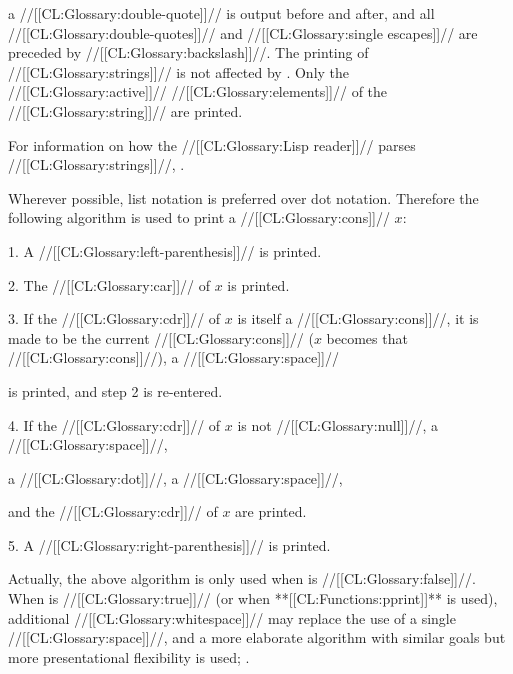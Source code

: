a //[[CL:Glossary:double-quote]]// is output before and after, and all //[[CL:Glossary:double-quotes]]// and //[[CL:Glossary:single escapes]]// are preceded by //[[CL:Glossary:backslash]]//. The printing of //[[CL:Glossary:strings]]// is not affected by . Only the //[[CL:Glossary:active]]// //[[CL:Glossary:elements]]// of the //[[CL:Glossary:string]]// are printed.

For information on how the //[[CL:Glossary:Lisp reader]]// parses //[[CL:Glossary:strings]]//, \seesection\Doublequote.

\endsubsubsection%

Wherever possible, list notation is preferred over dot notation.   Therefore the following algorithm is used to print a //[[CL:Glossary:cons]]// $x$:

\goodbreak \beginlist \item{1.} A //[[CL:Glossary:left-parenthesis]]// is printed.

\medbreak \item{2.} The //[[CL:Glossary:car]]// of $x$ is printed. 

\medbreak \item{3.} If the //[[CL:Glossary:cdr]]// of $x$ is itself a //[[CL:Glossary:cons]]//,
          it is made to be the current //[[CL:Glossary:cons]]//  	  (\ie $x$ becomes that //[[CL:Glossary:cons]]//),   	  a //[[CL:Glossary:space]]//

	  is printed,
          and step 2 is re-entered.

\medbreak \item{4.} If the //[[CL:Glossary:cdr]]// of $x$ is not //[[CL:Glossary:null]]//,   	  a //[[CL:Glossary:space]]//,

          a //[[CL:Glossary:dot]]//,  	  a //[[CL:Glossary:space]]//,

          and the //[[CL:Glossary:cdr]]// of $x$ are printed.

\medbreak \item{5.} A //[[CL:Glossary:right-parenthesis]]// is printed. \endlist

 Actually, the above algorithm is only used when  is //[[CL:Glossary:false]]//.  When  is //[[CL:Glossary:true]]// (or  when **[[CL:Functions:pprint]]** is used), additional //[[CL:Glossary:whitespace]]//  may replace the use of a single //[[CL:Glossary:space]]//, and a more elaborate algorithm with similar goals but more presentational  flexibility is used; \seesection\PrinterDispatch.

